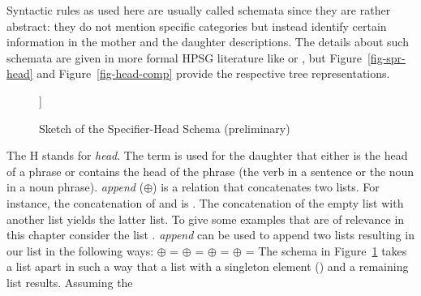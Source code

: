 \noindent
Syntactic rules as used here are usually called schemata since they are rather abstract: they do not
mention specific categories but instead identify certain information in the mother and the daughter descriptions.
The details about such schemata are given in more formal HPSG literature like
 or , 
but Figure~\vref{fig-spr-head} and
Figure~\vref{fig-head-comp} provide the respective tree representations.
\begin{figure}
\begin{forest}
[H\feattab{\spr \ibox{1}}%
  [\ibox{2}]
  [H\feattab{\spr \ibox{1} $\oplus$ \sliste{ \ibox{2} },\\
             \comps \eliste}
  ]]
\end{forest}
\caption{\label{fig-spr-head}Sketch of the Specifier-Head Schema (preliminary)}
\end{figure}
The H stands for \emph{head}. The term  is used for the daughter that either is
the head of a phrase or contains the head of the phrase (\eg the verb in a sentence or the noun in a
noun phrase). \emph{append} ($\oplus$) is a relation that concatenates two 
lists. For instance, the concatenation of  and  is
. The concatenation of the empty list \eliste{} with another list yields
the latter list. To give some examples that are of relevance in this chapter consider the list
. \emph{append} can be used to append two
lists resulting in our list in the following ways:
\eal
\ex \eliste{} $\oplus$  = 
\ex {} $\oplus$  = 
\ex {} $\oplus$  = 
\ex {} $\oplus$ \eliste{} = 
\zl
The schema in Figure~\ref{fig-spr-head} takes a list apart in such a way that a list with a
singleton element () and a remaining list  results. Assuming the
